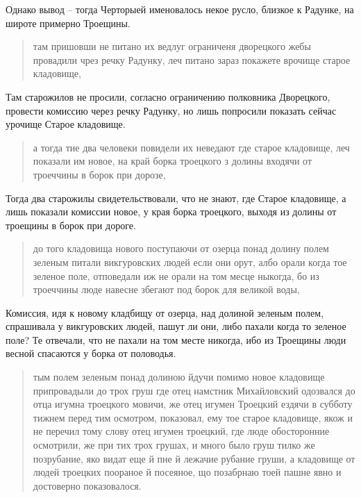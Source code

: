 Однако вывод – тогда Черторыей именовалось некое русло, близкое к Радунке, на широте примерно Троещины.

\begin{quotation}
там пришовши не питано их ведлуг ограниченя дворецкого жебы провадили чрез речку Радунку, леч питано зараз покажете врочище старое кладовище,
\end{quotation}

Там старожилов не просили, согласно ограничению полковника Дворецкого, провести комиссию через речку Радунку, но лишь попросили показать сейчас урочище Старое кладовище.

\begin{quotation}
а тогда тие два человеки повидели их неведают где старое кладовище, леч показали им новое, на край борка троецкого з долины входячи от троеччины в борок при дорозе, 
\end{quotation}

Тогда два старожилы свидетельствовали, что не знают, где Старое кладовище, а лишь показали комиссии новое, у края борка троецкого, выходя из долины от троещины в борок при дороге.

\begin{quotation}
до того кладовища нового поступаючи от озерца понад долину полем зеленым питали викгуровских людей если они орут, албо орали когда тое зеленое поле, отповедали иж не орали на том месце ныкогда, бо из троеччины люде навесне збегают под борок для великой воды, 
\end{quotation}

Комиссия, идя к новому кладбищу от озерца, над долиной зеленым полем, спрашивала у викгуровских людей, пашут ли они, либо пахали когда то зеленое поле? Те отвечали, что не пахали на том месте никогда, ибо из Троещины люди весной спасаются у борка от половодья.

\begin{quotation}
тым полем зеленым понад долиною йдучи помимо новое кладовище припровадыли до трох груш где отец намстник Михайловский одозвался до отца игумна троецкого мовичи, же отец игумен Троецкий ездячи в субботу тижнем перед тим осмотром, показовал, ему тое старое кладовище, якож и не перечил тому слову отец игумен троецкий, где люде обосторонние осмотрили, же при тих трох грушах, и много было груш тилко же позрубание, яко видат еще й пне й лежачие рубание груши, а кладовище от людей троецких поораное й посеяное, що позабрнаю тоей пашне явно и достоверно показовалося.
\end{quotation}

